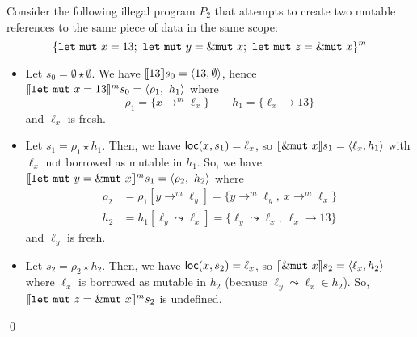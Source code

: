 \begin{example}
  Consider the following illegal program $P_2$
  that attempts to create two mutable references
  to the same piece of data in the same scope:
  \[
    \{
      \mathtt{let\ mut}\ x = 13;\
      \mathtt{let\ mut}\ y = \mutborrow x;\
      \mathtt{let\ mut}\ z = \mutborrow x
    \}^m
  \]
  \begin{itemize}
    \item Let $s_0=\emptyset \star \emptyset$.
    We have $\den[13]{s_0} = \langle 13,\emptyset\rangle$, hence
    $\denl[\mathtt{let\ mut}\ x = 13]{m}{s_0} =
    \langle \rho_1,\ h_1\rangle$ where
    \[\rho_1=\{x\to^m\ell_x\} \qquad
    h_1 = \{\ell_x\to 13\}\]
    and $\ell_x$ is fresh.
    \item Let $s_1 = \rho_1 \star h_1$.
    Then, we have $\loc(x,s_1) = \ell_x$, so
    $\den[\mutborrow x]{s_1} = \langle \ell_x,h_1\rangle$
    with $\ell_x$ not borrowed as mutable in $h_1$.
    So, we have
    $\denl[\mathtt{let\ mut}\ y = \mutborrow x]{m}{s_1} =
    \langle \rho_2,\ h_2\rangle$
    where
    \begin{align*}
      \rho_2 & = \rho_1[y\to^m\ell_y] = \{y\to^m\ell_y,\ x\to^m\ell_x\}\\
      h_2 & = h_1[\ell_y\leadsto \ell_x] =
      \{\ell_y\leadsto \ell_x,\ \ell_x\to 13\}
    \end{align*}
    and $\ell_y$ is fresh.
    \item Let $s_2 = \rho_2 \star h_2$.
    Then, we have $\loc(x,s_2) = \ell_x$, so
    $\den[\mutborrow x]{s_2} = \langle \ell_x,h_2\rangle$
    where $\ell_x$ is borrowed as mutable in $h_2$
    (because $\ell_y\leadsto \ell_x \in h_2$).
    So, $\denl[\mathtt{let\ mut}\ z = \mutborrow x]{m}{s_2}$
    is undefined.
  \end{itemize}
  \qed
\end{example}

